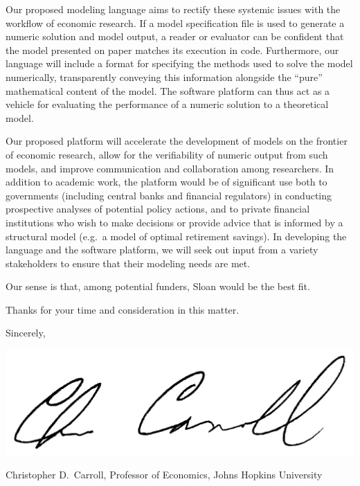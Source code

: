\documentclass[11pt,pdftex,letterpaper]{article}
\begin{document}




Our proposed modeling language aims to rectify these systemic issues with the workflow of economic research. If a model specification file is used to generate a numeric solution and model output, a reader or evaluator can be confident that the model presented on paper matches its execution in code. Furthermore, our language will include a format for specifying the methods used to solve the model numerically, transparently conveying this information alongside the ``pure'' mathematical content of the model. The software platform can thus act as a vehicle for evaluating the performance of a numeric solution to a theoretical model.

Our proposed platform will accelerate the development of models on the frontier of economic research, allow for the verifiability of numeric output from such models, and improve communication and collaboration among researchers. In addition to academic work, the platform would be of significant use both to governments (including central banks and financial regulators) in conducting prospective analyses of potential policy actions, and to private financial institutions who wish to make decisions or provide advice that is informed by a structural model (e.g.\ a model of optimal retirement savings). In developing the language and the software platform, we will seek out input from a variety stakeholders to ensure that their modeling needs are met.

Our sense is that, among potential funders, Sloan would be the best fit.

Thanks for your time and consideration in this matter.

\vspace{0.5cm}

{\parskip=2pt Sincerely,

  \includegraphics[scale=0.7]{CDCsignature.jpg}
  
Christopher D.\ Carroll, Professor of Economics, Johns Hopkins University}
\end{document}
